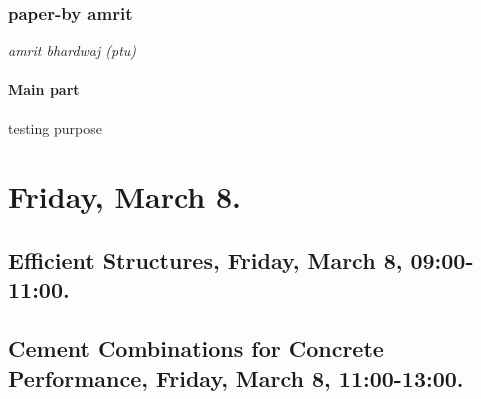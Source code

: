 

\label{8}

\subsection*{paper-by amrit}
\textit{amrit bhardwaj (ptu)}

% 



\subsubsection*{Main part}

testing purpose







\chapter*{Friday, March 8.}



\section*{Efficient Structures, Friday, March 8, 09:00-11:00.}





\section*{Cement Combinations for Concrete Performance, Friday, March 8, 11:00-13:00.}





